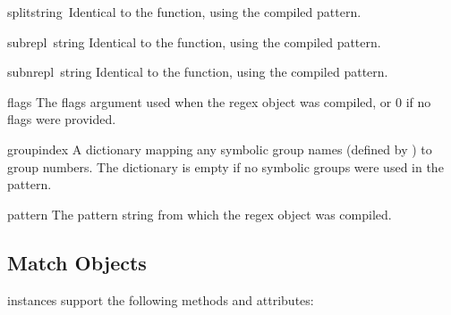 \begin{funcdesc}{split}{string\, }
Identical to the  function, using the compiled pattern.
\end{funcdesc}

\begin{funcdesc}{sub}{repl\, string}
Identical to the  function, using the compiled pattern.
\end{funcdesc}

\begin{funcdesc}{subn}{repl\, string}
Identical to the  function, using the compiled pattern.
\end{funcdesc}


\begin{datadesc}{flags}
The flags argument used when the regex object was compiled, or 0 if no
flags were provided.
\end{datadesc}

\begin{datadesc}{groupindex}
A dictionary mapping any symbolic group names (defined by 
) to group numbers.  The dictionary is empty if no
symbolic groups were used in the pattern.
\end{datadesc}

\begin{datadesc}{pattern}
The pattern string from which the regex object was compiled.
\end{datadesc}

\subsection{Match Objects}

 instances support the following methods and attributes:

